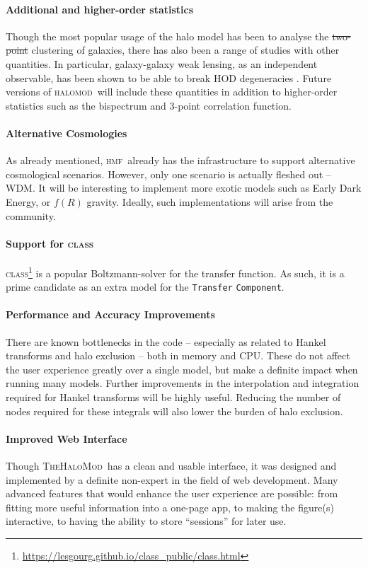 \documentclass[5p,aas_macros]{elsarticle}
\newcommand{\halomod}{\textsc{halomod}\xspace} %
\newcommand{\thm}{\textsc{TheHaloMod}\xspace} %
\newcommand{\hmf}{\textsc{hmf}\xspace} %
\newcommand{\component}{\texttt{Component}\xspace} %
\providecommand{\DIFaddtex}[1]{{\protect\color{blue}\uwave{#1}}} %
\providecommand{\DIFdeltex}[1]{{\protect\color{red}\sout{#1}}}                      %
\providecommand{\DIFaddbegin}{} %
\providecommand{\DIFaddend}{} %
\providecommand{\DIFdelbegin}{} %
\providecommand{\DIFdelend}{} %
\providecommand{\DIFadd}[1]{\texorpdfstring{\DIFaddtex{#1}}{#1}} %
\providecommand{\DIFdel}[1]{\texorpdfstring{\DIFdeltex{#1}}{}} %
\begin{document}
\paragraph*{Additional and higher-order statistics}
Though the most popular usage of the halo model has been to analyse the \DIFdelbegin \DIFdel{two-point }\DIFdelend \DIFaddbegin \DIFadd{2-point }\DIFaddend clustering of galaxies, there has also been a range of studies with other quantities. In particular, galaxy-galaxy weak lensing, as an independent observable, has been shown to be able to break HOD degeneracies \citep{Leauthaud2012}. Future versions of \halomod\  will include these quantities in addition to higher-order statistics such as the bispectrum and 3-point correlation function. 

\paragraph*{Alternative Cosmologies}
As already mentioned, \hmf\ already has the infrastructure to support alternative cosmological scenarios. However, only one scenario is actually fleshed out -- WDM. It will be interesting to implement more exotic models such as Early Dark Energy, or $f(R)$ gravity. Ideally, such implementations will arise from the community.

\paragraph*{Support for \textsc{class}}
\textsc{class}\footnote{\url{https://lesgourg.github.io/class_public/class.html}} \citep{Lesgourgues2011} is a popular Boltzmann-solver for the transfer function. As such, it is a prime candidate as an extra model for the \verb|Transfer| \component.

\paragraph*{Performance and Accuracy Improvements}
There are known bottlenecks in the code -- especially as related to Hankel transforms and halo exclusion -- both in memory and CPU. 
These do not affect the user experience greatly over a single model, but make a definite impact when running many models. Further improvements in the interpolation and integration required for Hankel transforms will be highly useful. Reducing the number of nodes required for these integrals will also lower the burden of halo exclusion.

\paragraph*{Improved Web Interface}
Though \thm\ has a clean and usable interface, it was designed and implemented by a definite non-expert in the field of web development. 
Many advanced features that would enhance the user experience are possible: from fitting more useful information into a one-page app, to making the figure(s) interactive, to having the ability to store ``sessions'' for later use. 
\end{document}
